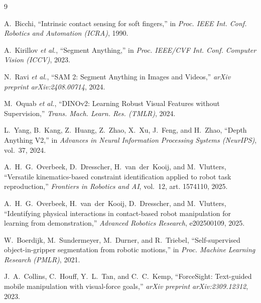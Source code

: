 \documentclass[letterpaper, 10pt, journal, twoside]{IEEEtran}
\begin{document}
\begin{thebibliography}{9}

A.~Bicchi, ``Intrinsic contact sensing for soft fingers,'' in
\emph{Proc. IEEE Int. Conf. Robotics and Automation (ICRA)}, 1990.

A.~Kirillov \emph{et al.}, ``Segment Anything,'' in \emph{Proc. IEEE/CVF
Int. Conf. Computer Vision (ICCV)}, 2023.

N.~Ravi \emph{et al.}, ``SAM 2: Segment Anything in Images and Videos,''
\emph{arXiv preprint arXiv:2408.00714}, 2024.

M.~Oquab \emph{et al.}, ``DINOv2: Learning Robust Visual Features without
Supervision,'' \emph{Trans. Mach. Learn. Res. (TMLR)}, 2024.

L.~Yang, B.~Kang, Z.~Huang, Z.~Zhao, X.~Xu, J.~Feng, and H.~Zhao,
``Depth Anything V2,'' in \emph{Advances in Neural Information
Processing Systems (NeurIPS)}, vol.~37, 2024.

A.~H.~G.~Overbeek, D.~Dresscher, H.~van~der~Kooij, and M.~Vlutters,
``Versatile kinematics-based constraint identification applied to robot
task reproduction,'' \emph{Frontiers in Robotics and AI}, vol.~12, art.
1574110, 2025.

A.~H.~G.~Overbeek, H.~van~der~Kooij, D.~Dresscher, and M.~Vlutters,
``Identifying physical interactions in contact-based robot manipulation
for learning from demonstration,'' \emph{Advanced Robotics Research},
e202500109, 2025.

W.~Boerdijk, M.~Sundermeyer, M.~Durner, and R.~Triebel, ``Self-supervised
object-in-gripper segmentation from robotic motions,'' in \emph{Proc.
Machine Learning Research (PMLR)}, 2021.

J.~A.~Collins, C.~Houff, Y.~L.~Tan, and C.~C.~Kemp, ``ForceSight:
Text-guided mobile manipulation with visual-force goals,'' \emph{arXiv
preprint arXiv:2309.12312}, 2023.

\end{thebibliography}
\end{document}
